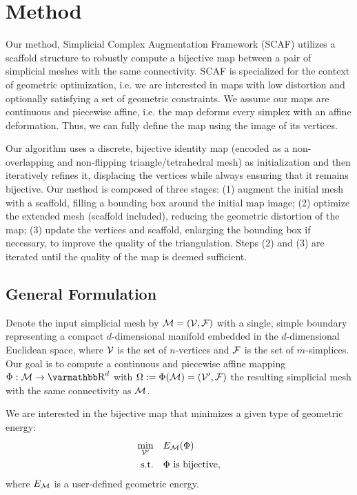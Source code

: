 \section{Method}

Our method, Simplicial Complex Augmentation Framework (SCAF) utilizes a scaffold structure to robustly compute a bijective map between a pair of simplicial meshes with the same connectivity. SCAF is specialized for the context of geometric optimization, i.e. we are interested in maps with low distortion and optionally satisfying a set of geometric constraints. We assume our maps are continuous and piecewise affine, i.e. the map deforms every simplex with an affine deformation. Thus, we can fully define the map using the image of its vertices.

 Our algorithm uses a discrete, bijective identity map (encoded as a non-overlapping and non-flipping triangle/tetrahedral mesh)  as initialization and then iteratively refines it, displacing the vertices while always ensuring that it remains bijective. Our method is composed of three stages: (1) augment the initial mesh with a scaffold, filling a bounding box around the initial map image; (2) optimize the extended mesh (scaffold included), reducing the geometric distortion of the map; (3) update the vertices and scaffold, enlarging the bounding box if necessary, to improve the quality of the triangulation. Steps (2) and (3) are iterated until the quality of the map is deemed sufficient.  

\subsection{General Formulation} \label{sec:general_form}
Denote the input simplicial mesh by $\operatorname{\mathcal{M}} = (\mathcal{V},\mathcal{F})$ with a single, simple boundary representing a compact $d$-dimensional manifold embedded in the $d$-dimensional Euclidean space, where $\mathcal{V}$ is the set of $n$-vertices and $\mathcal{F}$ is the set of $m$-simplices. Our goal is to compute a continuous and piecewise affine mapping 
$\Phi : \Mesh \rightarrow \R^{d}$ with $\Omega := \Phi(\operatorname{\mathcal{M}}) = (\mathcal{V}',\mathcal{F})$ the resulting simplicial mesh with the same connectivity as $\operatorname{\mathcal{M}}$. 

We are interested in the bijective map that minimizes a given type of geometric energy:
\begin{align}
\begin{split}\label{eq:bijective_energy}
    \min_{\mathcal{V}'}& \quad E_{\operatorname{\mathcal{M}}} (\Phi) \\
    \text{s.t.}& \quad \Phi\text{ is bijective},
\end{split}
\end{align}
where $E_{\operatorname{\mathcal{M}}}$ is a user-defined geometric energy.

